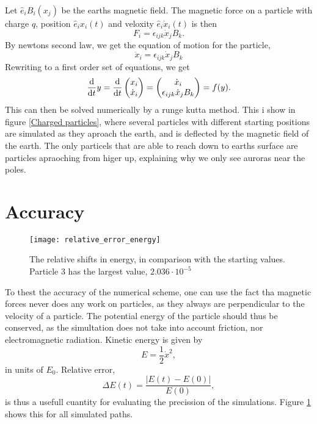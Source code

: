 \documentclass{article}
\begin{document}
        Let $ \hat e_i B_i(x_j)$ be the earths magnetic field. The magnetic force on a particle with charge $q$, position $\hat e_i x_i(t)$ and veloxity $\hat e_i \dot x_i (t)$ is then
        \begin{equation}
            F_i = \epsilon_{ijk} \dot x_j B_k.
        \end{equation}
        By newtons second law, we get the equation of motion for the particle,
        \begin{equation}
            \ddot x_i = \epsilon_{ijk} \dot x_j B_k
        \end{equation}
        Rewriting to a first order set of equations, we get
        \begin{align*}
            \dv{t} y = \dv{t} 
            \begin{pmatrix}
                x_i \\
                \dot x_i
            \end{pmatrix}
            = 
            \begin{pmatrix}
                \dot x_i \\
                \epsilon_{ijk} \dot x_j B_k
            \end{pmatrix}
            = f(y).
        \end{align*}
        This can then be solved numerically by a runge kutta method. This i show in figure \ref{Charged particles}, where several particles with different starting positions are simulated as they aproach the earth, and is deflected by the magnetic field of the earth. The only particels that are able to reach down to earths surface are particles apraoching from higer up, explaining why we only see auroras near the poles.

    \section*{Accuracy}
    \begin{figure}
        \centering
        \texttt{[image: relative\_error\_energy]}
        \label{Relative error}
        \caption{The relative shifts in energy, in comparison with the starting values. Particle 3 has the largest value, $2.036 \cdot 10^{-5}$}
    \end{figure}

    To thest the accuracy of the numerical scheme, one can use the fact tha magnetic forces never does any work on particles, as they always are perpendicular to the velocity of a particle. The potential energy of the particle should thus be conserved, as the simultation does not take into account friction, nor electromagnetic radiation. Kinetic energy is given by
    $$
        E = \frac{1}{2}\dot x^2,
    $$
    in units of $E_0$. Relative error,
    $$
        \Delta E(t) = \frac{|E(t) - E(0)|}{E(0)},
    $$
    is thus a usefull cuantity for evaluating the precission of the simulations. Figure \ref{Relative error} shows this for all simulated paths.
\end{document}
